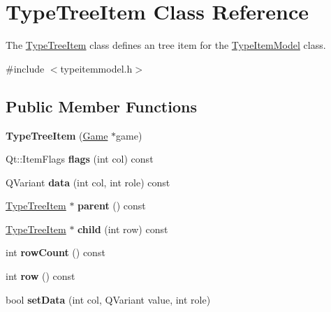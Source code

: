 \hypertarget{class_type_tree_item}{\section{\-Type\-Tree\-Item \-Class \-Reference}
\label{class_type_tree_item}
}


\-The \hyperlink{class_type_tree_item}{\-Type\-Tree\-Item} class defines an tree item for the \hyperlink{class_type_item_model}{\-Type\-Item\-Model} class.  




{\ttfamily \#include $<$typeitemmodel.\-h$>$}

\subsection*{\-Public \-Member \-Functions}
\begin{DoxyCompactItemize}
\item 
\hypertarget{class_type_tree_item_a0955484034ad18bc778655fbcf78b435}{{\bfseries \-Type\-Tree\-Item} (\hyperlink{class_game}{\-Game} $\ast$game)}\label{class_type_tree_item_a0955484034ad18bc778655fbcf78b435}

\item 
\hypertarget{class_type_tree_item_a160ac83e2f8d1161735363bbb72ab0bb}{\-Qt\-::\-Item\-Flags {\bfseries flags} (int col) const }\label{class_type_tree_item_a160ac83e2f8d1161735363bbb72ab0bb}

\item 
\hypertarget{class_type_tree_item_a8665b9f195b39093ca6116ff65b09412}{\-Q\-Variant {\bfseries data} (int col, int role) const }\label{class_type_tree_item_a8665b9f195b39093ca6116ff65b09412}

\item 
\hypertarget{class_type_tree_item_a86e9e8d9fca786ac45e81e78d01b9397}{\hyperlink{class_type_tree_item}{\-Type\-Tree\-Item} $\ast$ {\bfseries parent} () const }\label{class_type_tree_item_a86e9e8d9fca786ac45e81e78d01b9397}

\item 
\hypertarget{class_type_tree_item_a06d4681904a79553a81b09d4b31f0731}{\hyperlink{class_type_tree_item}{\-Type\-Tree\-Item} $\ast$ {\bfseries child} (int row) const }\label{class_type_tree_item_a06d4681904a79553a81b09d4b31f0731}

\item 
\hypertarget{class_type_tree_item_a5308dd7d3672750f2d862683d2387dcc}{int {\bfseries row\-Count} () const }\label{class_type_tree_item_a5308dd7d3672750f2d862683d2387dcc}

\item 
\hypertarget{class_type_tree_item_aed3d1b02b89bc0a22842bc54833eaecd}{int {\bfseries row} () const }\label{class_type_tree_item_aed3d1b02b89bc0a22842bc54833eaecd}

\item 
\hypertarget{class_type_tree_item_a465d8935d2564e05d16a2765b8b69434}{bool {\bfseries set\-Data} (int col, \-Q\-Variant value, int role)}\label{class_type_tree_item_a465d8935d2564e05d16a2765b8b69434}

\end{DoxyCompactItemize}


